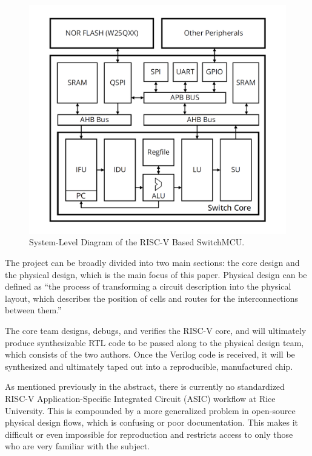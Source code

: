 \documentclass[conference]{IEEEtran}
\begin{document}
\begin{figure}[htbp]
    \centering
    \includegraphics[width=\linewidth]{fig1.png} 
    \caption{System-Level Diagram of the RISC-V Based SwitchMCU.}
    \label{fig}
\end{figure}

The project can be broadly divided into two main sections: the core design and the physical design, which is the main focus of this paper. Physical design can be defined as “the process of transforming a circuit description into the physical layout, which describes the position of cells and routes for the interconnections between them.” \cite{b3}

The core team designs, debugs, and verifies the RISC-V core, and will ultimately produce synthesizable RTL code to be passed along to the physical design team, which consists of the two authors. Once the Verilog code is received, it will be synthesized and ultimately taped out into a reproducible, manufactured chip.

As mentioned previously in the abstract, there is currently no standardized RISC-V Application-Specific Integrated Circuit (ASIC) workflow at Rice University. This is compounded by a more generalized problem in open-source physical design flows, which is confusing or poor documentation. This makes it difficult or even impossible for reproduction and restricts access to only those who are very familiar with the subject.
\end{document}
